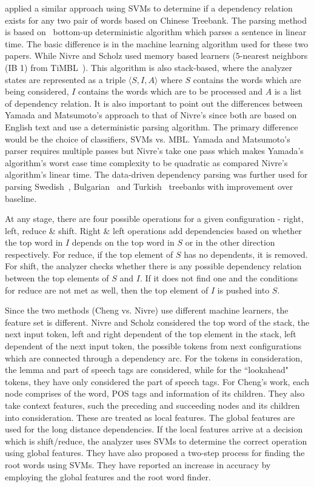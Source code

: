 \cite{cheng2005chinese} applied a similar approach using SVMs to determine if a dependency relation exists for any two pair of words based on  Chinese Treebank. The parsing method is based on~\cite{Nivre:2004:DDP:1220355.1220365} bottom-up deterministic algorithm which parses a sentence in linear time. The basic difference is in the machine learning algorithm used for these two papers. While Nivre and Scholz used memory based learners ($5$-nearest neighbors (IB 1) from TiMBL~\citep{daelemans2004timbl}). This algorithm is also stack-based, where the analyzer states are represented as a triple $\langle S, I, A \rangle$ where $S$ contains the words which are being considered, $I$ contains the words which are to be processed and $A$ is a list of dependency relation. 
It is also important to point out the differences between Yamada and Matsumoto's approach to that of Nivre's since both are based on English text and use a deterministic parsing algorithm. The primary difference would be the choice of classifiers, SVMs vs. MBL. Yamada and Matsumoto's parser requires multiple passes but Nivre's take one pass which makes Yamada's algorithm's worst case time complexity to be quadratic as compared Nivre's algorithm's linear time.
The data-driven dependency parsing was further used for parsing Swedish~\citep{nivrej.2004}, Bulgarian~\citep{marinov2005data} and Turkish~\citep{eryiugit2008dependency} treebanks with improvement over baseline.

At any stage, there are four possible operations for a given configuration - right, left, reduce \& shift. Right \& left operations add dependencies based on whether the top word in $I$ depends on the top word in $S$ or in the other direction respectively. For reduce, if the top element of $S$ has no dependents, it is removed. For shift, the analyzer checks whether there is any possible dependency relation between the top elements of $S$ and $I$. If it does not find one and the conditions for reduce are not met as well, then the top element of $I$ is pushed into $S$.

Since the two methods (Cheng vs. Nivre) use different machine learners, the feature set is different. Nivre and Scholz considered the top word of the stack, the next input token, left and right dependent of the top element in the stack, left dependent of the next input token, the possible tokens from next configurations which are connected through a dependency arc. For the tokens in consideration, the lemma and part of speech tags are considered, while for the ``lookahead" tokens, they have only considered the part of speech tags. For Cheng's work, each node comprises of the word, POS tags and information of its children. They also take context features, such the preceding and succeeding nodes and its children into consideration. These are treated as local features. The global features are used for the long distance dependencies. If the local features arrive at a decision which is shift/reduce, the analyzer uses SVMs to determine the correct operation using global features. They have also proposed a two-step process for finding the root words using SVMs. They have reported an increase in accuracy by employing the global features and the root word finder. 

